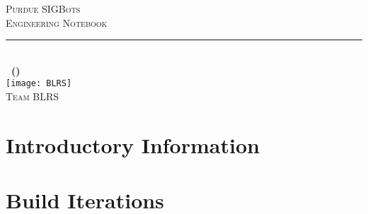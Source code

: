 \documentclass[
12pt, %
english %
]
{SIGBotsEngineeringNotebook} %
\begin{document}
\frontmatter %
\begin{titlepage}
\begin{center}

\textsc{\LARGE Purdue SIGBots}\\[1cm]
\textsc{\Large Engineering Notebook}\\[0.5cm]
\hrule %
\hfill \\[1.5cm] %
{\huge
\bfseries
\currentgame\ (\currentseason)
}
\\[1.5cm]
\texttt{[image: BLRS]}
\\[1cm]
\textsc{\Large Team BLRS}\\[0.5cm] %

\vfill
\end{center}
\end{titlepage}
\afterpage{\blankpage}

\clearpage %
\pagestyle{plain}
\tableofcontents
\clearpage
\listoffigures

\mainmatter %

\part{Introductory Information}
\pagestyle{Intro} %
\begin{Introductory Material}
\introtrue %




\end{Introductory Material}
\introfalse

\part{Build Iterations}
\pagestyle{Iterations} %






\end{document}
